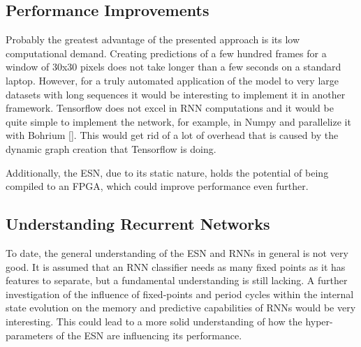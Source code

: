 \subsection{Performance Improvements}
Probably the greatest advantage of the presented approach is its low computational
demand. Creating predictions of a few hundred frames for a window of 30x30
pixels does not take longer than a few seconds on a standard laptop.  However,
for a truly automated application of the model to very large datasets with long
sequences it would be interesting to implement it in another framework.
Tensorflow does not excel in RNN computations and it would be quite simple to
implement the network, for example, in Numpy and parallelize it with Bohrium
[\cite{bohrium}]. This would get rid of a lot of overhead that is caused by the
dynamic graph creation that Tensorflow is doing.

Additionally, the ESN, due to its static nature, holds the potential of being
compiled to an FPGA, which could improve performance even further.


\subsection{Understanding Recurrent Networks}
To date, the general understanding of the ESN and RNNs in general is not very
good.  It is assumed that an RNN classifier needs as many fixed points as it
has features to separate, but a fundamental understanding is still lacking.  A
further investigation of the influence of fixed-points and period cycles within
the internal state evolution on the memory and predictive capabilities of RNNs
would be very interesting.  This could lead to a more solid understanding of
how the hyper-parameters of the ESN are influencing its performance.
